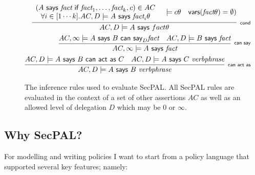 \documentclass[thesis.tex]{subfiles}
\begin{document}
\begin{figure}
  \centering
  \begin{eqnarray*}
    \infer[\textsf{\scriptsize cond}]{%
      AC, D \models A\textsf{~says~}fact\theta
    }{%
      \begin{array}[c]{c}
        \left(A\textsf{~says~}\textit{fact}\textsf{~if~}\textit{fact}_1, \ldots, \textit{fact}_k, c\right) \in AC \\
        \forall i \in [1\cdots k]. AC,D\models A\textsf{~says~}\textit{fact}_i\theta
      \end{array}
      & \models{c\theta}
      & \textsf{vars}(\textit{fact}\theta) = \emptyset)
    }\\
    \infer[\textsf{\scriptsize can say}]{%
      AC, \infty \models A\textsf{~says~}\textit{fact}
    }{%
      AC, \infty \models A\textsf{~says~}B\textsf{~can~say}_D \textit{fact}
      & AC, D \models B\textsf{~says~}\textit{fact}
    } \\
    \infer[\textsf{\scriptsize can act as}]{%
      AC, D \models A\textsf{~says~}B~\textit{verbphrase}
    }{%
      AC, D \models A\textsf{~says~}B\textsf{~can~act~as~}C
      & AC, D \models A\textsf{~says~}C~\textit{verbphrase}
    }
  \end{eqnarray*}
  \caption[Inference rules used to evaluate {SecPAL}.]{The inference rules used to evaluate {SecPAL}. All {SecPAL} rules are
  evaluated in the context of a set of other assertions $AC$ as well as an
  allowed level of delegation $D$ which may be $0$ or $\infty$.}
\label{secpal:rules}
\end{figure}


\subsection{Why SecPAL?}

For modelling and writing policies I want to start from a policy
language that supported several key features; namely:
\end{document}
